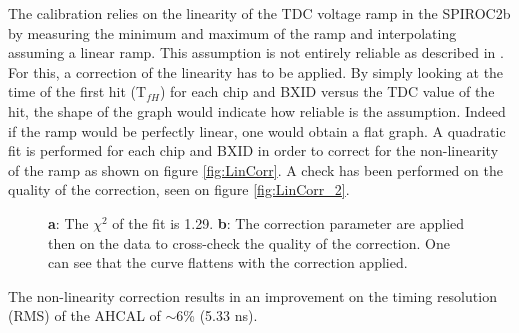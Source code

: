\documentclass[twoside,a4paper,11pt]{article}
\begin{document}
The calibration relies on the linearity of the TDC voltage ramp in the SPIROC2b by measuring the minimum and maximum of the ramp and interpolating assuming a linear ramp. This assumption is not entirely reliable as described in \cite{OskarSSP, EldwanSSP}. For this, a correction of the linearity has to be applied. By simply looking at the time of the first hit (T$_{fH}$) for each chip and BXID versus the TDC value of the hit, the shape of the graph would indicate how reliable is the assumption. Indeed if the ramp would be perfectly linear, one would obtain a flat graph.
A quadratic fit is performed for each chip and BXID in order to correct for the non-linearity of the ramp as shown on figure \ref{fig:LinCorr}. A check has been performed on the quality of the correction, seen on figure \ref{fig:LinCorr_2}.
\begin{figure}[htbp]
	\hfill
	\caption[]{\textbf{a}: The $\chi^2$ of the fit is 1.29. \textbf{b}: The correction parameter are applied then on the data to cross-check the quality of the correction. One can see that the curve flattens with the correction applied.}
\end{figure}
The non-linearity correction results in an improvement on the timing resolution (RMS) of the AHCAL of $\sim$6\% (5.33 ns).
\end{document}
